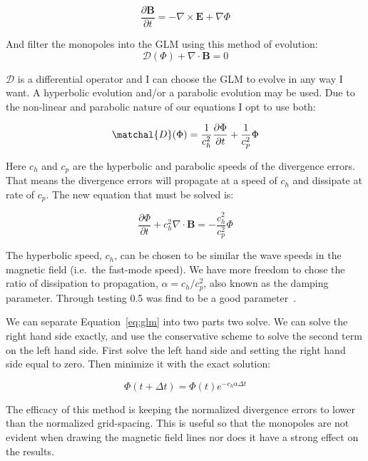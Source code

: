 \documentclass[12pt,upcase]{umlthesis}
\begin{document}
\begin{equation}
	\frac{\partial\textbf{B}}{\partial t} = - \nabla\times\textbf{E} + \nabla \Phi
\end{equation}

And filter the monopoles into the GLM using this method of evolution:
\begin{equation}
	\mathcal{D}(\Phi) + \nabla\cdot\textbf{B} = 0
\end{equation}

$\mathcal{D}$ is a differential operator and I can choose the GLM to evolve in any way I want. A hyperbolic evolution and/or a parabolic evolution may be used. Due to the non-linear and parabolic nature of our equations I opt to use both:

\begin{equation}
	\matchal{D}(\Phi) = \frac{1}{c^2_h}\frac{\partial\Phi}{\partial t} + \frac{1}{c^2_p}\Phi
\end{equation}

Here $c_h$ and $c_p$ are the hyperbolic and parabolic speeds of the divergence errors. That means the divergence errors will propagate at a speed of $c_h$ and dissipate at rate of $c_p$. The new equation that must be solved is:

\begin{equation}\label{eq:glm}
	\frac{\partial\Phi}{\partial t} + c^2_h \nabla\cdot\textbf{B} = - \frac{c^2_h}{c^2_p} \Phi
\end{equation}

The hyperbolic speed, $c_h$, can be chosen to be similar the wave speeds in the magnetic field (i.e.\ the fast-mode speed). We have more freedom to chose the ratio of dissipation to propagation, $\alpha = c_h / c^2_p$, also known as the damping parameter. Through testing 0.5 was find to be a good parameter~\citep[p. 5899-5911]{glm2}.

We can separate Equation~\ref{eq:glm} into two parts two solve. We can solve the right hand side exactly, and use the conservative scheme to solve the second term on the left hand side. First solve the left hand side and setting the right hand side equal to zero. Then minimize it with the exact solution:

\begin{equation}
	\Phi(t+\Delta t) = \Phi(t) e^{-c_h\alpha\Delta t}
\end{equation}

The efficacy of this method is keeping the normalized divergence errors to lower than the normalized grid-spacing. This is useful so that the monopoles are not evident when drawing the magnetic field lines nor does it have a strong effect on the results.
\end{document}

